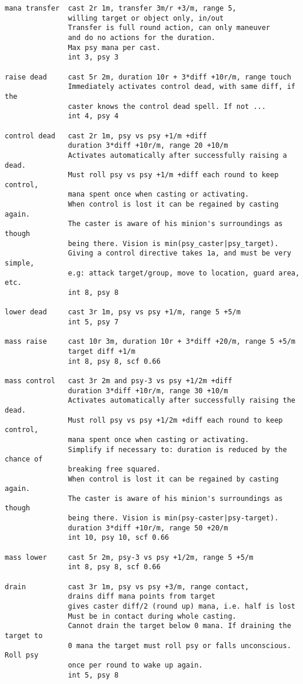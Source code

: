\begin{verbatim}
mana transfer  cast 2r 1m, transfer 3m/r +3/m, range 5,
               willing target or object only, in/out
               Transfer is full round action, can only maneuver
               and do no actions for the duration.
               Max psy mana per cast.
               int 3, psy 3

raise dead     cast 5r 2m, duration 10r + 3*diff +10r/m, range touch
               Immediately activates control dead, with same diff, if the
               caster knows the control dead spell. If not ...
               int 4, psy 4

control dead   cast 2r 1m, psy vs psy +1/m +diff
               duration 3*diff +10r/m, range 20 +10/m
               Activates automatically after successfully raising a dead.
               Must roll psy vs psy +1/m +diff each round to keep control,
               mana spent once when casting or activating.
               When control is lost it can be regained by casting again.
               The caster is aware of his minion's surroundings as though
               being there. Vision is min(psy_caster|psy_target).
               Giving a control directive takes 1a, and must be very simple,
               e.g: attack target/group, move to location, guard area, etc.
               int 8, psy 8

lower dead     cast 3r 1m, psy vs psy +1/m, range 5 +5/m
               int 5, psy 7

mass raise     cast 10r 3m, duration 10r + 3*diff +20/m, range 5 +5/m
               target diff +1/m
               int 8, psy 8, scf 0.66

mass control   cast 3r 2m and psy-3 vs psy +1/2m +diff
               duration 3*diff +10r/m, range 30 +10/m
               Activates automatically after successfully raising the dead.
               Must roll psy vs psy +1/2m +diff each round to keep control,
               mana spent once when casting or activating.
               Simplify if necessary to: duration is reduced by the chance of
               breaking free squared.
               When control is lost it can be regained by casting again.
               The caster is aware of his minion's surroundings as though
               being there. Vision is min(psy-caster|psy-target).
               duration 3*diff +10r/m, range 50 +20/m
               int 10, psy 10, scf 0.66

mass lower     cast 5r 2m, psy-3 vs psy +1/2m, range 5 +5/m
               int 8, psy 8, scf 0.66

drain          cast 3r 1m, psy vs psy +3/m, range contact,
               drains diff mana points from target
               gives caster diff/2 (round up) mana, i.e. half is lost
               Must be in contact during whole casting.
               Cannot drain the target below 0 mana. If draining the target to
               0 mana the target must roll psy or falls unconscious. Roll psy 
               once per round to wake up again.
               int 5, psy 8


\end{verbatim}
